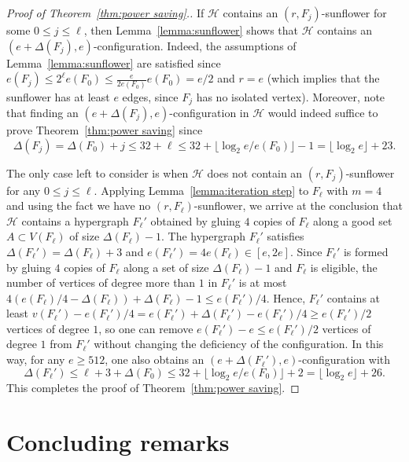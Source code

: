 \documentclass{daj}
\def\cH{\mathcal{H}}
\theoremstyle{plain}
\theoremstyle{remark}
\begin{document}
\begin{proof}[Proof of Theorem~\ref{thm:power saving}.]
If $\cH$ contains an $(r, F_j)$-sunflower for some $0\leq j\leq \ell$, then Lemma~\ref{lemma:sunflower} shows that $\cH$ contains an $(e+\Delta(F_j), e)$-configuration. Indeed, the assumptions of Lemma~\ref{lemma:sunflower} are satisfied since $e(F_j)\leq 2^\ell e(F_0)\leq \frac{e}{2e(F_0)}e(F_0)=e/2$ and $r=e$ (which implies that the sunflower has at least $e$ edges, since $F_j$ has no isolated vertex). Moreover, note that finding an $(e+\Delta(F_j), e)$-configuration in $\cH$ would indeed suffice to prove Theorem~\ref{thm:power saving} since
\[\Delta(F_j)=\Delta(F_0)+j\leq 32+\ell\leq 32+\lfloor \log_2 e/e(F_0) \rfloor -1= \lfloor \log_2 e\rfloor +23.\]

The only case left to consider is when $\cH$ does not contain an $(r, F_j)$-sunflower for any $0\leq j\leq \ell$. Applying Lemma~\ref{lemma:iteration step} to $F_\ell$ with $m=4$ and using the fact we have no $(r, F_\ell)$-sunflower, we arrive at the conclusion that $\cH$ contains a hypergraph $F_\ell'$ obtained by gluing $4$ copies of $F_\ell$ along a good set $A\subset V(F_\ell)$ of size $\Delta(F_\ell)-1$. The hypergraph $F_\ell'$ satisfies $\Delta(F_\ell')=\Delta(F_\ell)+3$ and $e(F_\ell')=4e(F_\ell)\in [e, 2e]$. Since $F_\ell'$ is formed by gluing $4$ copies of $F_\ell$ along a set of size $\Delta(F_\ell)-1$ and $F_\ell$ is eligible, the number of vertices of degree more than $1$ in $F_\ell'$ is at most $4(e(F_\ell)/4-\Delta(F_\ell))+\Delta(F_\ell)-1\leq e(F_\ell')/4$. Hence, $F_\ell'$ contains at least $v(F_\ell')-e(F_\ell')/4 = e(F_\ell')+\Delta(F_\ell')-e(F_\ell')/4 \ge e(F_\ell')/2$ vertices of degree $1$, so one can remove $e(F_\ell')-e\leq e(F_\ell')/2$ vertices of degree $1$ from $F_\ell'$ without changing the deficiency of the configuration. In this way, for any $e \ge 512$, one also obtains an $(e+\Delta(F_\ell'), e)$-configuration with \[ \Delta(F_\ell')\leq \ell+3+\Delta(F_0)\leq 32+\lfloor \log_2 e/e(F_0)\rfloor+2= \lfloor \log_2 e\rfloor +26.\]
This completes the proof of Theorem~\ref{thm:power saving}.
\end{proof}

\section{Concluding remarks}\label{sec:concluding remarks}
\end{document}
